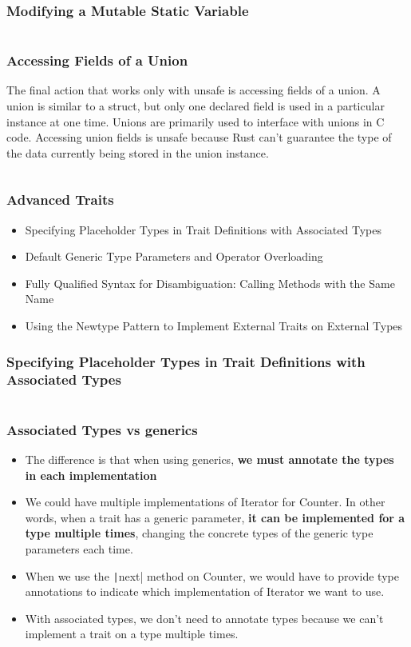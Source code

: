 \documentclass{beamer}
\begin{document}
\begin{frame}[fragile]
	\frametitle{Modifying a Mutable Static Variable}
	\inputminted{rust}{./code/unsafe7.rs}
\end{frame}


\begin{frame}[fragile]
	\frametitle{Accessing Fields of a Union}
	The final action that works only with unsafe is accessing fields of a union. A union is similar to a struct, but only one declared field is used in a particular instance at one time. Unions are primarily used to interface with unions in C code. Accessing union fields is unsafe because Rust can’t guarantee the type of the data currently being stored in the union instance. 
	
	\inputminted{rust}{./code/unsafe8.rs}
\end{frame}

\begin{frame}[fragile]
	\frametitle{Advanced Traits}
	\begin{itemize}
		\item Specifying Placeholder Types in Trait Definitions with Associated Types
		\item 	Default Generic Type Parameters and Operator Overloading
		\item 	Fully Qualified Syntax for Disambiguation: Calling Methods with the Same Name
		\item 	Using the Newtype Pattern to Implement External Traits on External Types
	\end{itemize}
\end{frame}

\begin{frame}[fragile]
	\frametitle{Specifying Placeholder Types in Trait Definitions with Associated Types}
	\inputminted[fontsize=\scriptsize]{rust}{./code/iter1.rs}
\end{frame}


\begin{frame}[fragile]
	\frametitle{Associated Types vs generics}
	\begin{itemize}
		\item The difference is that when using generics, \textbf{we must annotate the types in each implementation}
		\item 	 We could have multiple implementations of Iterator for Counter. In other words, when a trait has a generic parameter, \textbf{it can be implemented for a type multiple times}, changing the concrete types of the generic type parameters each time. 
		\item 	 When we use the \texttt|next|  method on Counter, we would have to provide type annotations to indicate which implementation of Iterator we want to use.
		\item 	With associated types, we don’t need to annotate types because we can’t implement a trait on a type multiple times. 
	\end{itemize}
	
	\inputminted{rust}{./code/iter2.rs}
\end{frame}
\end{document}
